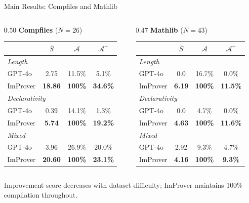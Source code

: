 \begin{frame}{Main Results: Compfiles and Mathlib}
\begin{columns}[T]
\begin{column}{0.50\textwidth}
\textbf{Compfiles} ($N=26$)\\[0.3em]
\begin{tabular}{l|ccc}
\toprule
& $\overline{S}$ & $\mathcal{A}$ & $\mathcal{A}^+$\\
\midrule
\multicolumn{4}{l}{\emph{Length}}\\
GPT-4o & 2.75 & 11.5\% & 5.1\%\\
ImProver & \textbf{18.86} & \textbf{100\%} & \textbf{34.6\%}\\
\multicolumn{4}{l}{\emph{Declarativity}}\\
GPT-4o & 0.39 & 14.1\% & 1.3\%\\
ImProver & \textbf{5.74} & \textbf{100\%} & \textbf{19.2\%}\\
\multicolumn{4}{l}{\emph{Mixed}}\\
GPT-4o & 3.96 & 26.9\% & 20.0\%\\
ImProver & \textbf{20.60} & \textbf{100\%} & \textbf{23.1\%}\\
\bottomrule
\end{tabular}
\end{column}
\begin{column}{0.47\textwidth}
\textbf{Mathlib} ($N=43$)\\[0.3em]
\begin{tabular}{l|ccc}
\toprule
& $\overline{S}$ & $\mathcal{A}$ & $\mathcal{A}^+$\\
\midrule
\multicolumn{4}{l}{\emph{Length}}\\
GPT-4o & 0.0 & 16.7\% & 0.0\%\\
ImProver & \textbf{6.19} & \textbf{100\%} & \textbf{11.5\%}\\
\multicolumn{4}{l}{\emph{Declarativity}}\\
GPT-4o & 0.0 & 4.7\% & 0.0\%\\
ImProver & \textbf{4.63} & \textbf{100\%} & \textbf{11.6\%}\\
\multicolumn{4}{l}{\emph{Mixed}}\\
GPT-4o & 2.92 & 9.3\% & 4.7\%\\
ImProver & \textbf{4.16} & \textbf{100\%} & \textbf{9.3\%}\\
\bottomrule
\end{tabular}
\end{column}
\end{columns}
\vspace{0.3em}
\small Improvement score decreases with dataset difficulty; ImProver maintains 100\% compilation throughout.
\end{frame}

